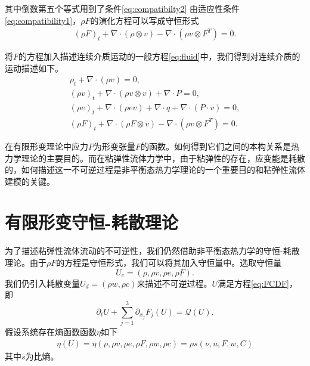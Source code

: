 \documentclass{article}
\begin{document}
其中倒数第五个等式用到了条件\eqref{eq:compatibilty2}
由适应性条件\eqref{eq:compatibility1}，$\rho F$的演化方程可以写成守恒形式
\begin{eqnarray*}
(\rho F)_t + \nabla \cdot (\rho \otimes v) - \nabla \cdot (\rho v \otimes F^T) = 0 .
\end{eqnarray*} 

将$F$的方程加入描述连续介质运动的一般方程\eqref{eq:fluid}中，我们得到对连续介质的运动描述如下。
\begin{subequations}\label{eq:continuum}
\begin{align}
\rho_t + \nabla \cdot (\rho v )=0, \\
(\rho v)_t + \nabla \cdot (\rho v \otimes v) + \nabla \cdot P = 0, \\
(\rho e)_t + \nabla \cdot (\rho e v) + \nabla \cdot q + \nabla \cdot (P \cdot v) = 0 ,\\
(\rho F)_t + \nabla \cdot (\rho F \otimes v) - \nabla \cdot (\rho v \otimes F^T) = 0 .
\end{align}
\end{subequations}

在有限形变理论中应力$P$为形变张量$F$的函数。如何得到它们之间的本构关系是热力学理论的主要目的。而在粘弹性流体力学中，由于粘弹性的存在，应变能是耗散的，如何描述这一不可逆过程是非平衡态热力学理论的一个重要目的和粘弹性流体建模的关键。

\section{有限形变守恒-耗散理论}
为了描述粘弹性流体流动的不可逆性，我们仍然借助非平衡态热力学的守恒-耗散理论。由于$\rho F$的方程是守恒形式，我们可以将其加入守恒量中。选取守恒量
$$U_c = (\rho, \rho v, \rho e, \rho F).$$
我们仍引入耗散变量$U_d = (\rho w,\rho c)$来描述不可逆过程。$U$满足方程\eqref{eq:FCDF}，即
\begin{equation}\label{eq:FCDF}
		\partial_t U + \sum_{j=1}^3 \partial_{x_j} F_j(U) = \mathcal{Q} (U) .
\end{equation}
假设系统存在熵函数函数$\eta$如下
\begin{eqnarray*}
\eta(U) = \eta(\rho, \rho v, \rho e,\rho F,\rho w, \rho c) = \rho s(\nu,u,F,w,C)
\end{eqnarray*}
其中$s$为比熵。
\end{document}
